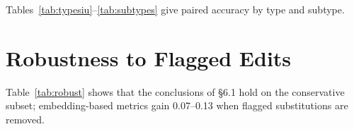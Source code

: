 \documentclass[11pt]{article}
\newcommand{\Pc}{\textsc{p}\xspace}
\newcommand{\Cc}{\textsc{c}\xspace}
\newcommand{\ctrlz}{\textsc{Ctrl-0}\xspace}
\begin{document}
\begin{table}[t]
\centering
\small
\begin{adjustbox}{max width=\textwidth}

\end{adjustbox}
\caption{\ctrlz paired accuracy by edit type, IU X-Ray.}
\label{tab:typesiu}
\end{table}

\begin{table}[t]
\centering
\small
\begin{adjustbox}{max width=\textwidth}

\end{adjustbox}
\caption{\ctrlz paired accuracy by edit type, MIMIC-CXR.}
\label{tab:typesmimic}
\end{table}

\begin{table}[t]
\centering
\small
\begin{adjustbox}{max width=\textwidth}

\end{adjustbox}
\caption{\ctrlz paired accuracy by subtype (IU X-Ray / MIMIC-CXR). $^{\ddagger}$The unit subtype is not shape-matched (the \Pc edit changes two tokens, the \Cc edit one) and behaves like a confounded comparison for surface-driven metrics.}
\label{tab:subtypes}
\end{table}

Tables~\ref{tab:typesiu}--\ref{tab:subtypes} give paired accuracy by type and subtype.

\section{Robustness to Flagged Edits}
\label{app:robust}

\begin{table}[t]
\centering
\small
\begin{adjustbox}{max width=\textwidth}

\end{adjustbox}
\caption{\ctrlz paired accuracy (IU X-Ray / MIMIC-CXR) on all targets and after removing, in turn, the non-matched unit subtype, every target whose meaning-preserving substitution we flagged in advance as debatable, and both together with eight awkward negation rewrites.}
\label{tab:robust}
\end{table}

Table~\ref{tab:robust} shows that the conclusions of \S6.1 hold on the conservative subset; embedding-based metrics gain 0.07--0.13 when flagged substitutions are removed.
\end{document}
